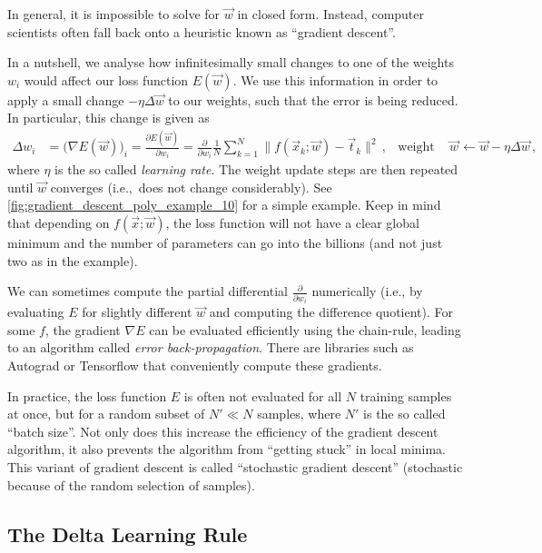 \documentclass[10pt,letterpaper,oneside]{article}
\begin{document}
In general, it is impossible to solve for $\vec w$ in closed form. Instead, computer scientists often fall back onto a heuristic known as \enquote{gradient descent}.

In a nutshell, we analyse how infinitesimally small changes to one of the weights $w_i$ would affect our loss function $E(\vec w)$. We use this information in order to apply a small change $- \eta \Delta \vec w$ to our weights, such that the error is being reduced. In particular, this change is given as
\begin{align*}
	\Delta w_i &= \big( \nabla E(\vec w) \big)_i =  \frac{\partial E(\vec w)}{\partial w_i} = \frac{\partial}{\partial w_i} \frac{1}{N} \sum_{k = 1}^N \big\| f(\vec x_k ; \vec w) - \vec t_k \big\|^2 \,, & \text{weight update step } \vec w &\gets \vec w - \eta \Delta \vec w \,,
\end{align*}
where $\eta$ is the so called \emph{learning rate}. The weight update steps are then repeated until $\vec w$ converges (i.e.,~does not change considerably). See \cref{fig:gradient_descent_poly_example_10} for a simple example. Keep in mind that depending on $f(\vec x; \vec w)$, the loss function will not have a clear global minimum and the number of parameters can go into the billions (and not just two as in the example).

We can sometimes compute the partial differential $\frac{\partial}{\partial w_i}$ numerically (i.e., by evaluating $E$ for slightly different $\vec w$ and computing the difference quotient). For some $f$, the gradient $\nabla E$ can be evaluated efficiently using the chain-rule, leading to an algorithm called \emph{error back-propagation}. There are libraries such as Autograd or Tensorflow that conveniently compute these gradients.

In practice, the loss function $E$ is often not evaluated for all $N$ training samples at once, but for a random subset of $N' \ll N$ samples, where $N'$ is the so called \enquote{batch size}. Not only does this increase the efficiency of the gradient descent algorithm, it also prevents the algorithm from \enquote{getting stuck} in local minima. This variant of gradient descent is called \enquote{stochastic gradient descent} (stochastic because of the random selection of samples).

\subsection{The Delta Learning Rule}
\end{document}
